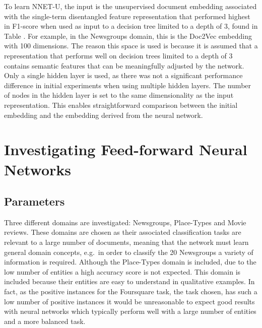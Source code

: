 To learn NNET-U, the input is the unsupervised document embedding associated with the single-term disentangled feature representation that performed highest in F1-score when used as input to a  decision tree limited to a depth of 3,  found in Table \hmark{\ref{allresultsch3}}. For example, in the Newsgroups domain, this is the Doc2Vec embedding with 100 dimensions. The reason this space is used is because it is assumed that a representation that performs well on  decision trees limited to a depth of 3 contains semantic features that can be meaningfully adjusted by the network. Only a single hidden layer is used, as there was not a significant performance difference in initial experiments when using multiple hidden layers. The number of nodes in the hidden layer is set to  the same dimensionality as the input representation. This enables straightforward comparison between the initial  embedding and the embedding derived from the neural network.










\section{Investigating Feed-forward Neural Networks}\label{ch5:results}

\subsection{Parameters}

Three different domains are investigated: Newsgroups, Place-Types and Movie reviews. These domains are chosen as their  associated classification tasks are relevant to a large number of documents, meaning that the network must learn general domain concepts, e.g.\ in order to classify the 20 Newsgroups a variety  of information is required. Although the Place-Types domain is included, due to the low number of entities a high accuracy score is not expected. This domain is included  because their entities are easy to understand in qualitative examples. In fact, as the positive instances for the Foursquare task, the task chosen, has such a low number of positive instances it would be unreasonable to expect good results with neural networks which typically perform well with a large number of entities and a more balanced task.

